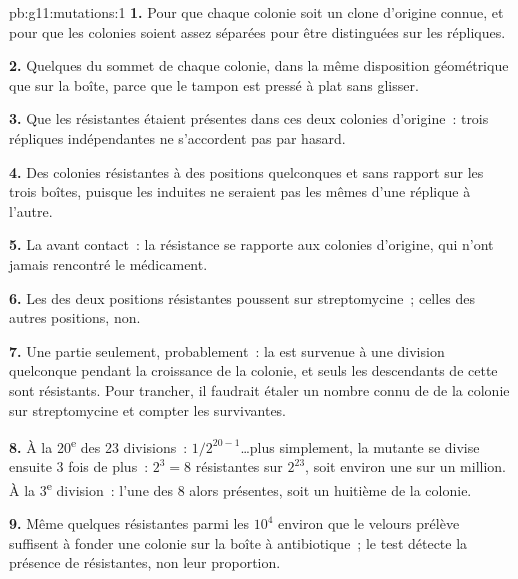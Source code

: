 \begin{solution}{pb:g11:mutations:1}
\textbf{1.} Pour que chaque colonie soit un clone d'origine connue, et
pour que les colonies soient assez séparées pour être distinguées sur
les répliques.

\textbf{2.} Quelques  du sommet de chaque colonie, dans la même
disposition géométrique que sur la boîte, parce que le tampon est
pressé à plat sans glisser.

\textbf{3.} Que les  résistantes étaient présentes dans ces
deux colonies d'origine~: trois répliques indépendantes ne s'accordent
pas par hasard.

\textbf{4.} Des colonies résistantes à des positions quelconques et
sans rapport sur les trois boîtes, puisque les  induites ne
seraient pas les mêmes d'une réplique à l'autre.

\textbf{5.} La  avant contact~: la résistance se rapporte aux
colonies d'origine, qui n'ont jamais rencontré le médicament.

\textbf{6.} Les  des deux positions résistantes poussent sur
streptomycine~; celles des autres positions, non.

\textbf{7.} Une partie seulement, probablement~: la  est
survenue à une division quelconque pendant la croissance de la colonie,
et seuls les descendants de cette  sont résistants. Pour
trancher, il faudrait étaler un nombre connu de  de la colonie
sur streptomycine et compter les survivantes.

\textbf{8.} À la 20\textsuperscript{e} des 23 divisions~:
$1/2^{20-1}$\dots plus simplement, la  mutante se divise ensuite
3 fois de plus~: $2^3 = 8$  résistantes sur $2^{23}$, soit
environ une sur un million. À la 3\textsuperscript{e} division~: l'une
des 8  alors présentes, soit un huitième de la colonie.

\textbf{9.} Même quelques  résistantes parmi les $10^4$ environ
que le velours prélève suffisent à fonder une colonie sur la boîte à
antibiotique~; le test détecte la présence de  résistantes, non
leur proportion.


\end{solution}
